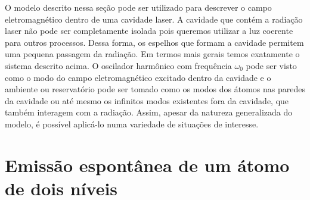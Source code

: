 \documentclass{article}
\begin{document}
O modelo descrito nessa seção pode ser utilizado para descrever o campo eletromagnético dentro de uma cavidade laser. A cavidade que contém a radiação laser não pode ser completamente isolada pois queremos utilizar a luz coerente para outros processos. Dessa forma, os espelhos que formam a cavidade permitem uma pequena passagem da radiação. Em termos mais gerais temos exatamente o sistema descrito acima. O oscilador harmônico com frequência $\omega_0$ pode ser visto como o modo do campo eletromagnético excitado dentro da cavidade e o ambiente ou reservatório pode ser tomado como os modos dos átomos nas paredes da cavidade ou até mesmo os infinitos modos existentes fora da cavidade, que também interagem com a radiação. Assim, apesar da natureza generalizada do modelo, é possível aplicá-lo numa variedade de situações de interesse.

\section{Emissão espontânea de um átomo de dois níveis}
\end{document}
